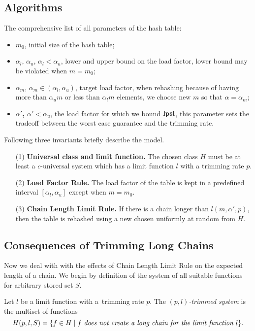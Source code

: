 \subsection{Algorithms}
The comprehensive list of all parameters of the hash table:
\begin{itemize}
	\item {$m_0$}, initial size of the hash table;
	\item {$\alpha_l$, $\alpha_u$, $\alpha_l < \alpha_u$}, lower and upper bound on the load factor, lower bound may be violated when $m = m_0$;
	\item {$\alpha_m$, $\alpha_m \in (\alpha_l, \alpha_u)$}, target load factor, when rehashing because of having more than $\alpha_u m$ or less than $\alpha_l m$ elements, we choose new $m$ so that $\alpha = \alpha_m$;
	\item \textbf{$\alpha'$, $\alpha' < \alpha_u$}, the load factor for which we bound $\mathbf{lpsl}$, this parameter sets the tradeoff between the worst case guarantee and the trimming rate.
\end{itemize}
Following three invariants briefly describe the model. 
\begin{itemize}
\item[(1)] \textbf{Universal class and limit function.} The chosen class $H$ must be at least a $c$-universal system which has a limit function $l$ with a trimming rate $p$.
\item[(2)] \textbf{Load Factor Rule.} The load factor of the table is kept in a predefined interval $[\alpha_l, \alpha_u]$ except when $m = m_0$.
\item[(3)] \textbf{Chain Length Limit Rule.} If there is a chain longer than $l(m, \alpha', p)$, then the table is rehashed using a new chosen uniformly at random from $H$.
\end{itemize}



\subsection{Consequences of Trimming Long Chains}
Now we deal with with the effects of Chain Length Limit Rule on the expected length of a chain.
We begin by definition of the system of all suitable functions for arbitrary stored set $S$.
\begin{definition}
\label{definition-trimmed-system}
Let $l$ be a limit function with a~trimming rate $p$.
The \emph{$(p, l)$-trimmed system} is the multiset of functions \[ H(p, l, S) = \{ f \in H \mid f \textit{ does not create a long chain for the limit function $l$} \}. \]
\end{definition}

